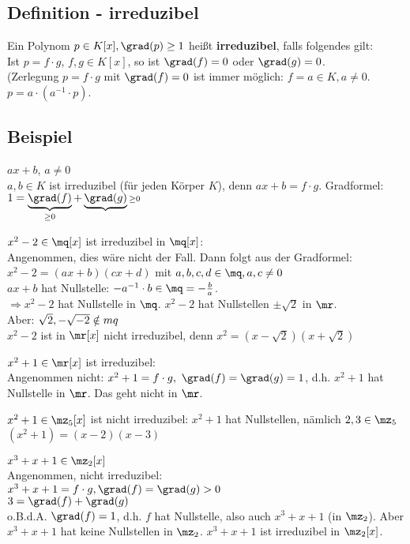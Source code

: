 	\subsection{Definition - irreduzibel}

	Ein Polynom $p\in K[x],\grad(p)\geq 1$ heißt \textbf{irreduzibel}, falls folgendes gilt:\\
	Ist $p=f\cdot g$, $f,g\in K[x]$, so ist $\grad(f)=0$ oder $\grad(g)=0$.\\
	(Zerlegung $p=f\cdot g$ mit $\grad(f)=0$ ist immer möglich: $f=a\in K,a\neq 0$. $p=a\cdot(a^{-1}\cdot p)$.

	\subsection{Beispiel}

	\item $ax+b$, $a\neq 0$\\
	$a,b\in K$ ist irreduzibel (für jeden Körper $K$), denn $ax+b=f\cdot g$. Gradformel: $1=\underbrace{\grad(f)}_{\scriptstyle \geq 0}+\underbrace{\grad(g)}{\scriptstyle \geq 0}$
	\item $x^2-2\in\mq[x]$ ist irreduzibel in $\mq[x]$:\\
	Angenommen, dies wäre nicht der Fall. Dann folgt aus der Gradformel: $x^2-2=(ax+b)(cx+d)$ mit $a,b,c,d\in\mq,a,c\neq 0$\\
	$ax+b$ hat Nullstelle: $-a^{-1}\cdot b\in\mq=-\frac{b}{a}$.\\
	$\Rightarrow x^2-2$ hat Nullstelle in $\mq$. $x^2-2$ hat Nullstellen $\pm\sqrt{2}$ in $\mr$.\\
	Aber: $\sqrt{2},-\sqrt{-2}\notin\\mq$\\
	$x^2-2$ ist in $\mr[x]$ nicht irreduzibel, denn $x^2=(x-\sqrt{2})(x+\sqrt{2})$
	\item $x^2+1\in\mr[x]$ ist irreduzibel:\\
	Angenommen nicht: $x^2+1=f\cdot g,\ \grad(f)=\grad(g)=1$,
	d.h. $x^2+1$ hat Nullstelle in $\mr$. Das geht nicht in $\mr$.
	\item $x^2+1\in\mz_5[x]$ ist nicht irreduzibel: $x^2+1$ hat Nullstellen, nämlich $2,3\in\mz_5$ $(x^2+1)=(x-2)(x-3)$
	\item $x^3+x+1\in\mz_2[x]$\\
	Angenommen, nicht irreduzibel:\\
	$x^3+x+1=f\cdot g,\grad(f)=\grad(g)>0$\\
	$3=\grad(f)+\grad(g)$\\
	o.B.d.A. $\grad(f)=1$, d.h. $f$ hat Nullstelle, also auch $x^3+x+1$ (in $\mz_2$). Aber $x^3+x+1$ hat keine Nullstellen in $\mz_2$. $x^3+x+1$ ist irreduzibel in $\mz_2[x]$.
	\subExEnd

